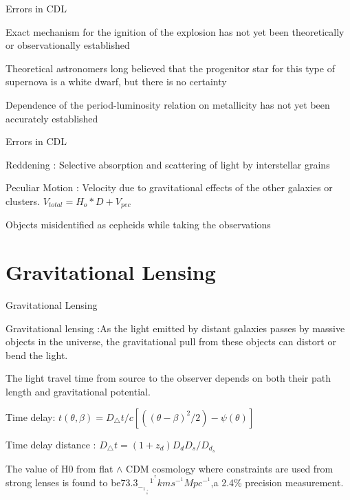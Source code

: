 \documentclass[aspectratio=169]{beamer}                    %
\begin{document}
\begin{frame}{Errors in CDL}
    \begin{vfilleditems}
        \item Exact mechanism for the ignition of the explosion has not yet been theoretically or observationally established
        \item Theoretical astronomers long believed that the progenitor star for this type of supernova is a white dwarf, but there is no certainty
        \item Dependence of the period-luminosity relation on metallicity has not yet been accurately established
    \end{vfilleditems}
    
\end{frame}

\begin{frame}{Errors in CDL}
    \begin{vfilleditems}
        \item Reddening : Selective absorption and scattering of light by interstellar grains
        \item Peculiar Motion : Velocity due to gravitational effects of the other galaxies or clusters. $V_{total} = H_{o}*D + V_{pec}$
        \item Objects misidentified as cepheids while taking the observations
        

    \end{vfilleditems}
    
\end{frame}
\section{Gravitational Lensing}
\begin{frame}{Gravitational Lensing}
    \begin{vfilleditems}
        \item Gravitational lensing :As the light emitted by distant galaxies passes by massive objects in the universe, the gravitational pull from these objects can distort or bend the light. 
        \item The light travel time from source to the observer depends on both their path length and gravitational potential.
        \item Time delay: $t(\theta,\beta) = D _ \triangle t / c [((\theta -\beta)^2 /2)-\psi(\theta)] $
        \item Time delay distance : $D _ \triangle t = (1 + z_d) D_dD_s/D_d_s$
        \item The value of H0 from flat $\wedge$ CDM cosmology where constraints are used from strong lenses is found to be$73.3_-_1_._8^+^1^.^7 km s^-^1Mpc^-^1$,a 2.4\% precision measurement.
    \end{vfilleditems}
\end{frame}
\end{document}
